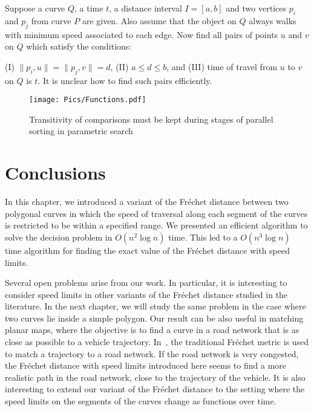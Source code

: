 \documentclass[12pt]{dalthesis}
\newcommand{\REM}[1]{}
\newcommand{\CF}{{\mathscr F}}
\newcommand{\Frechet}{Fr\'echet }
\newcommand{\distFS}{\delta_{\bar{F}}} \newcommand{\distWeakF}{\delta_{\bar{N}}} \newcommand{\distClosedF}{\delta_{\bar{C}}} \newcommand{\distPartialF}{\delta_{\bar{P}}} \newcommand{\distGrpahF}{\delta_{\bar{G}}} \newcommand{\distDisF}{\delta_{dF}} \newcommand{\distGeoF}{\delta_{\hat{F}}} \newcommand{\distHomF}{\delta_{h}} \newcommand{\distC}{\delta_C} \newcommand{\distSetF}{\delta_{\CF}}
\begin{document}
Suppose a curve $Q$, a time $t$, a distance interval $I=[a,b]$ 
and two vertices $p_i$ and $p_j$ from curve $P$ are given. 
Also assume that the object on $Q$ always walks 
with minimum speed associated to each edge. 
Now find all pairs of points $u$ and $v$ on $Q$ which satisfy the conditions:

(I) $\|p_i,u\|  = \|p_j, v \| = d$,  (II) $a \le d \le b$, and 
(III) time of travel from $u$ to $v$ on $Q$ is $t$.
It is unclear how to find such pairs efficiently. 

\REM{
The total preprocessing time must be less than $o(n^3)$ for all 
the vertices of $P$.
If the above sub-problem can be solved in 
$O(\log n + k)$ time,  to compute $\distFS(P,Q)$,
one can use the randomized approach in \cite{HarPeled11}
to achieve an algorithm with expected running time less than $o(n^3)$.
}

\begin{figure}[t]
	\centering
	\texttt{[image: Pics/Functions.pdf]}  
	\caption{Transitivity of comparisons must be kept during stages of parallel sorting in parametric search}
	\label{fig:PSproblem}
\end{figure}




\section{Conclusions} \label{sec:conclusion}

In this chapter, we introduced a variant of the \Frechet distance between two polygonal curves
in which the speed of traversal along each segment of the curves is restricted to be within a specified range.
We presented an efficient algorithm to solve the decision problem
in $O(n^2 \log n)$ time.
This led to a $O(n^3 \log n)$ time algorithm for finding 
the exact value of the \Frechet distance with speed limits.



Several open problems arise from our work.
In particular, it is interesting to consider 
speed limits in
other variants of the \Frechet distance studied in the literature. In the next chapter, we will study the
same problem  in the case where 
two curves lie inside a simple polygon.
Our result can be also useful 
in matching planar maps, where the objective is 
to find a curve in a road network that is as close as possible to a vehicle trajectory. 
In~\cite{AltERW03a}, the traditional \Frechet metric is used to match 
a trajectory to a road network. 
If the road network is very congested,  
the \Frechet distance with speed limits introduced here seems to find a more realistic path in the road network, 
close to the trajectory of the vehicle.
It is also interesting to extend our variant of the \Frechet distance 
to the setting where the speed limits on the segments of the curves change as functions over time.
\end{document}
